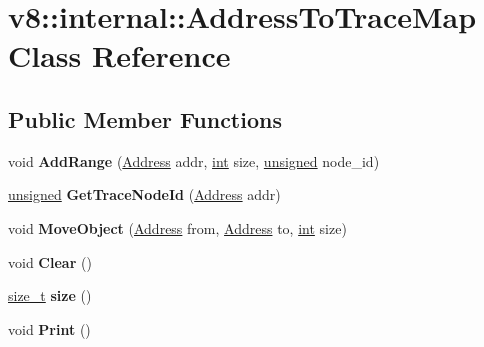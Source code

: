 \hypertarget{classv8_1_1internal_1_1AddressToTraceMap}{}\section{v8\+:\+:internal\+:\+:Address\+To\+Trace\+Map Class Reference}
\label{classv8_1_1internal_1_1AddressToTraceMap}
\subsection*{Public Member Functions}
\begin{DoxyCompactItemize}
\item 
\mbox{\label{classv8_1_1internal_1_1AddressToTraceMap_a3b1bc8f1abc6f072a660d2b689852838}} 
void {\bfseries Add\+Range} (\mbox{\hyperlink{classuintptr__t}{Address}} addr, \mbox{\hyperlink{classint}{int}} size, \mbox{\hyperlink{classunsigned}{unsigned}} node\+\_\+id)
\item 
\mbox{\label{classv8_1_1internal_1_1AddressToTraceMap_ab76fa587a105ae24f300f171d8cb22a6}} 
\mbox{\hyperlink{classunsigned}{unsigned}} {\bfseries Get\+Trace\+Node\+Id} (\mbox{\hyperlink{classuintptr__t}{Address}} addr)
\item 
\mbox{\label{classv8_1_1internal_1_1AddressToTraceMap_a02c96d03b3486527aeb46a461c43cf15}} 
void {\bfseries Move\+Object} (\mbox{\hyperlink{classuintptr__t}{Address}} from, \mbox{\hyperlink{classuintptr__t}{Address}} to, \mbox{\hyperlink{classint}{int}} size)
\item 
\mbox{\label{classv8_1_1internal_1_1AddressToTraceMap_aa705b7b0e3c00645af20ff4d61140f02}} 
void {\bfseries Clear} ()
\item 
\mbox{\label{classv8_1_1internal_1_1AddressToTraceMap_a6acf57cbb1975fe242c744f4ad5669f3}} 
\mbox{\hyperlink{classsize__t}{size\+\_\+t}} {\bfseries size} ()
\item 
\mbox{\label{classv8_1_1internal_1_1AddressToTraceMap_a8aa12b1b9b85be5aba73b0631d1ea389}} 
void {\bfseries Print} ()
\end{DoxyCompactItemize}


